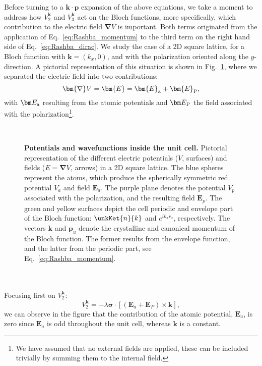 Before turning to a $\bm{k} \cdot \bm{p}$ expansion of the above equations, we take a moment to address how $V^{\bm k}_2$ and $V^{\bm k}_3$ act on the Bloch functions, more specifically, which contribution to the electric field $\bm{\nabla}V$ is important.
Both terms originated from the application of Eq.~\eqref{eq:Rashba_momentum} to the third term on the right hand side of Eq.~\eqref{eq:Rashba_dirac}.
We study the case of a 2D square lattice, for a Bloch function with $\bm k = (k_x, 0)$, and with the polarization oriented along the $y$-direction.
A pictorial representation of this situation is shown in Fig.~\ref{fig:Efield_cell_drawing}, where we separated the electric field into two contributions:
\begin{equation}
	\bm{\nabla} V = \bm{E} = \bm{E}_{\rm a} + \bm{E}_{\rm P},
\end{equation}
with $\bm E_{\rm a}$ resulting from the atomic potentials and $\bm E_{\rm P}$ the field associated with the polarization\footnote{We have assumed that no external fields are applied, these can be included trivially by summing them to the internal field.}.
\begin{figure}[h]
~\centering
{}\caption{\label{fig:Efield_cell_drawing}{\bf Potentials and wavefunctions inside the unit cell.} Pictorial representation of the different electric potentials ($V$, surfaces) and fields ($E=\bm \nabla V$, arrows) in a 2D square lattice. The blue spheres represent the atoms, which produce the spherically symmetric red potential $V_a$ and field $\bm E_a$. The purple plane denotes the potential $V_p$ associated with the polarization, and the resulting field $\bm E_p$. The green and yellow surfaces depict the cell periodic and envelope part of the Bloch function: $\unkKet{n}{k}$ and $e^{ik_x r_x}$, respectively. The vectors $\bm k$ and $\bm p_u$ denote the crystalline and canonical momentum of the Bloch function.
The former results from the envelope function, and the latter from the periodic part, see Eq.~\eqref{eq:Rashba_momentum}.}
\end{figure}
\\\\
Focusing first on $V^{\bm k}_2$:
\begin{equation}
	\label{eq:Rashba_purerel}
	V^{\bm k}_2 = -\lambda \bm{\sigma} \cdot \left[ (\bm E_a + \bm E_P) \times \bm{k}\right],
\end{equation}
we can observe in the figure that the contribution of the atomic potential, $\bm E_a$, is zero since $\bm E_a$ is odd throughout the unit cell, whereas $\bm k$ is a constant.
